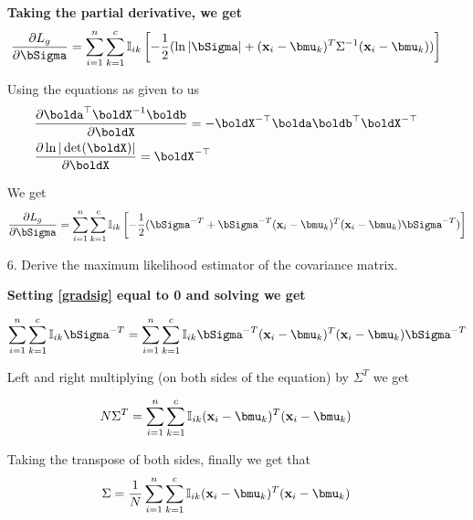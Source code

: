 \documentclass[submit]{harvardml}
\newenvironment{answer}{%
    \color{answergreen}\bf}
  {%
  }
\begin{document}
\begin{enumerate}
\begin{answer}
        Taking the partial derivative, we get 
        \begin{equation}
        \frac{\partial L_g}{\partial \bSigma} = 
            \sum_{i=1}^n \sum_{k=1}^c \mBI \left[ 
            -\frac{1}{2} (
                \ln|\bSigma|+(\bx_i-\bmu_k)^T\Sigma^{-1} (\bx_i-\bmu_k) )
                \right] 
        \end{equation}

        Using the equations as given to us
    \begin{align*}
      & \frac{\partial \bolda^\top \boldX^{-1} \boldb}{\partial \boldX} = - \boldX^{-\top} \bolda \boldb^\top \boldX^{-\top} \\
      & \frac{\partial \ln | \det (\boldX) |}{\partial \boldX} = \boldX^{-\top}
     \end{align*}

     We get 
        \begin{equation}
        \frac{\partial L_g}{\partial \bSigma} = 
            \sum_{i=1}^n \sum_{k=1}^c \mBI \left[ 
            -\frac{1}{2} (
            \bSigma^{-T} + \bSigma^{-T} (\bx_i - \bmu_k)^T (\bx_i - \bmu_k)
            \bSigma^{-T} )
                \right]  \label{gradsig}
        \end{equation}


 \end{answer}
  \item[6.] Derive the maximum likelihood estimator of the covariance matrix.

      \begin{answer}
      Setting  \eqref{gradsig} equal to 0 and solving we get 

        \begin{equation}
            \sum_{i=1}^n \sum_{k=1}^c \mBI \bSigma^{-T} =
            \sum_{i=1}^n \sum_{k=1}^c \mBI \bSigma^{-T} (\bx_i - \bmu_k)^T (\bx_i - \bmu_k)
            \bSigma^{-T} 
        \end{equation}


        Left and right multiplying (on both sides of the equation) by
        $\Sigma^{T}$ we get 

        $$
          N \Sigma ^T =  
            \sum_{i=1}^n \sum_{k=1}^c \mBI (\bx_i - \bmu_k)^T (\bx_i - \bmu_k)
            $$

            Taking the transpose of both sides, finally we get that 
        $$
          \Sigma  =   \frac{1}{N}
            \sum_{i=1}^n \sum_{k=1}^c \mBI (\bx_i - \bmu_k)^T (\bx_i - \bmu_k)
            $$
      \end{answer}


\end{enumerate}
\end{document}
